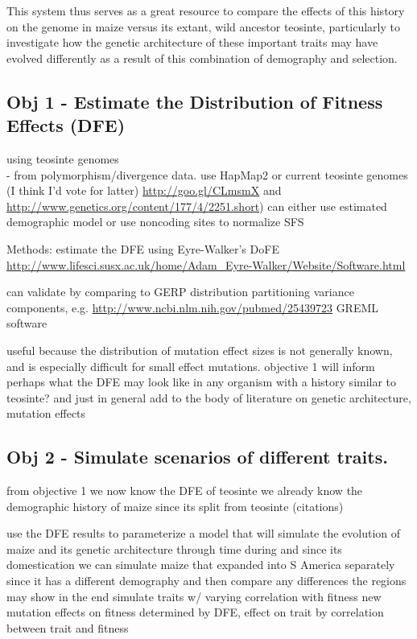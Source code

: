 This system thus serves as a great resource to compare the effects of this history on the genome in maize versus its extant, wild ancestor teosinte, particularly to investigate how the genetic architecture of these important traits may have evolved differently as a result of this combination of demography and selection.


\subsection{Obj 1 - Estimate the Distribution of Fitness Effects (DFE)}

	using teosinte genomes \\
		- from polymorphism/divergence data. use HapMap2 or current teosinte genomes (I think I'd vote for latter)
		\url{http://goo.gl/CLmsmX} and \url{http://www.genetics.org/content/177/4/2251.short})
		can either use estimated demographic model or use noncoding sites to normalize SFS
		
	Methods: estimate the DFE using Eyre-Walker's DoFE \url{http://www.lifesci.susx.ac.uk/home/Adam_Eyre-Walker/Website/Software.html}
	
	can validate by comparing to
		GERP distribution
		partitioning variance components, e.g. \url{http://www.ncbi.nlm.nih.gov/pubmed/25439723}
		GREML software
				

	useful because the distribution of mutation effect sizes is not generally known, and is especially difficult for small effect mutations.
	objective 1 will inform perhaps what the DFE may look like in any organism with a history similar to teosinte? 
	and just in general add to the body of literature on genetic architecture, mutation effects

	
\subsection{Obj 2 - Simulate scenarios of different traits.}
	
	from objective 1 we now know the DFE of teosinte
	we already know the demographic history of maize since its split from teosinte (citations)
	
	use the DFE results to parameterize a model that will simulate the evolution of maize and its genetic architecture through time during and since its domestication
	we can simulate maize that expanded into S America separately since it has a different demography and then compare any differences the regions may show in the end
		simulate traits w/ varying correlation with fitness
		new mutation effects on fitness determined by DFE, effect on trait by correlation between trait and fitness
	
